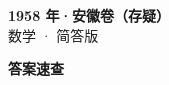 \documentclass[zihao=-4, a4paper]{ctexart}
\begin{document}
\begin{center}
  {\Large\bfseries 1958 年·安徽卷（存疑）}\\[4pt]
  {\large 数学 · 简答版}
\end{center}
\medskip
{}

\clearpage
{}
\begin{center}{\Large\bfseries 答案速查}\end{center}
\medskip

\end{document}
